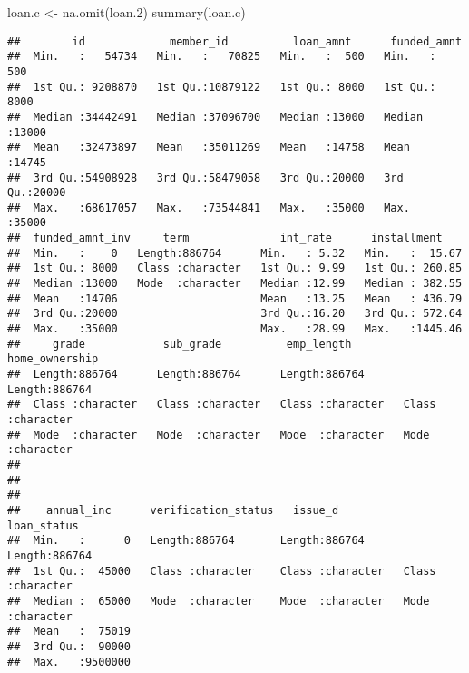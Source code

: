 \documentclass[
]{article}
\newenvironment{Shaded}{\begin{snugshade}}{\end{snugshade}}
\newcommand{\FloatTok}[1]{\textcolor[rgb]{0.00,0.00,0.81}{#1}}
\newcommand{\FunctionTok}[1]{\textcolor[rgb]{0.00,0.00,0.00}{#1}}
\newcommand{\NormalTok}[1]{#1}
\newcommand{\OtherTok}[1]{\textcolor[rgb]{0.56,0.35,0.01}{#1}}
\begin{document}
\begin{Shaded}
\begin{Highlighting}[]
\NormalTok{loan.c }\OtherTok{\textless{}{-}} \FunctionTok{na.omit}\NormalTok{(loan}\FloatTok{.2}\NormalTok{)}
\FunctionTok{summary}\NormalTok{(loan.c)}
\end{Highlighting}
\end{Shaded}

\begin{verbatim}
##        id             member_id          loan_amnt      funded_amnt   
##  Min.   :   54734   Min.   :   70825   Min.   :  500   Min.   :  500  
##  1st Qu.: 9208870   1st Qu.:10879122   1st Qu.: 8000   1st Qu.: 8000  
##  Median :34442491   Median :37096700   Median :13000   Median :13000  
##  Mean   :32473897   Mean   :35011269   Mean   :14758   Mean   :14745  
##  3rd Qu.:54908928   3rd Qu.:58479058   3rd Qu.:20000   3rd Qu.:20000  
##  Max.   :68617057   Max.   :73544841   Max.   :35000   Max.   :35000  
##  funded_amnt_inv     term              int_rate      installment     
##  Min.   :    0   Length:886764      Min.   : 5.32   Min.   :  15.67  
##  1st Qu.: 8000   Class :character   1st Qu.: 9.99   1st Qu.: 260.85  
##  Median :13000   Mode  :character   Median :12.99   Median : 382.55  
##  Mean   :14706                      Mean   :13.25   Mean   : 436.79  
##  3rd Qu.:20000                      3rd Qu.:16.20   3rd Qu.: 572.64  
##  Max.   :35000                      Max.   :28.99   Max.   :1445.46  
##     grade            sub_grade          emp_length        home_ownership    
##  Length:886764      Length:886764      Length:886764      Length:886764     
##  Class :character   Class :character   Class :character   Class :character  
##  Mode  :character   Mode  :character   Mode  :character   Mode  :character  
##                                                                             
##                                                                             
##                                                                             
##    annual_inc      verification_status   issue_d          loan_status       
##  Min.   :      0   Length:886764       Length:886764      Length:886764     
##  1st Qu.:  45000   Class :character    Class :character   Class :character  
##  Median :  65000   Mode  :character    Mode  :character   Mode  :character  
##  Mean   :  75019                                                            
##  3rd Qu.:  90000                                                            
##  Max.   :9500000                                                            

\end{verbatim}
\end{document}
